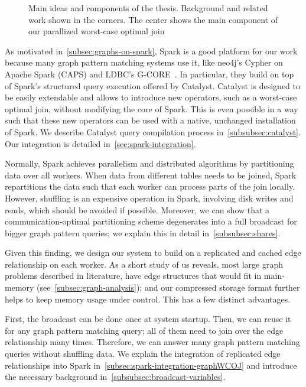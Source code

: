 \begin{figure}
    \centering
    
    \caption{
    Main ideas and components of the thesis.
    Background and related work shown in the corners.
    The center shows the main component of our parallized worst-case optimal join
    }
    \label{fig:thesis-overview}
\end{figure}

As motivated in~\cref{subsec:graphs-on-spark}, Spark is a good platform for our work because many graph pattern matching systems use
it, like neo4j's Cypher on Apache Spark (CAPS) and LDBC's G-CORE~\cite{caps,gcore}.
In particular, they build on top of Spark's structured query execution offered by Catalyst.
Catalyst is designed to be easily extendable and allows to introduce new operators, such as a worst-case optimal join,
without modifying the core of Spark.
This is even possible in a way such that these new operators can be used with a native, unchanged installation of Spark.
We describe Catalyst query compilation process in~\cref{subsubsec:catalyst}.
Our integration is detailed in~\cref{sec:spark-integration}.

Normally, Spark achieves parallelism and distributed algorithms by partitioning data over all workers.
When data from different tables needs to be joined, Spark repartitions the data such that each worker can process parts of the join locally.
However, shuffling is an expensive operation in Spark, involving disk writes and reads, which should be avoided if possible.
Moreover, we can show that a communication-optimal partitioning scheme degenerates into a full broadcast for bigger graph pattern queries;
we explain this in detail in~\cref{subsubsec:shares}.

Given this finding, we design our system to build on a replicated and cached edge relationship on each worker.
As a short study of us reveals, most large graph problems described in literature, have edge structures that would fit in
main-memory (see~\cref{subsec:graph-analysis});
and our compressed storage format further helps to keep memory usage under control.
This has a few distinct advantages.

First, the broadcast can be done once at system startup.
Then, we can reuse it for any graph pattern matching query;
all of them need to join over the edge relationship many times.
Therefore, we can answer many graph pattern matching queries without shuffling data.
We explain the integration of replicated edge relationships into Spark in~\cref{subsec:spark-integration-graphWCOJ} and introduce
the necessary background in~\cref{subsubsec:broadcast-variables}.

